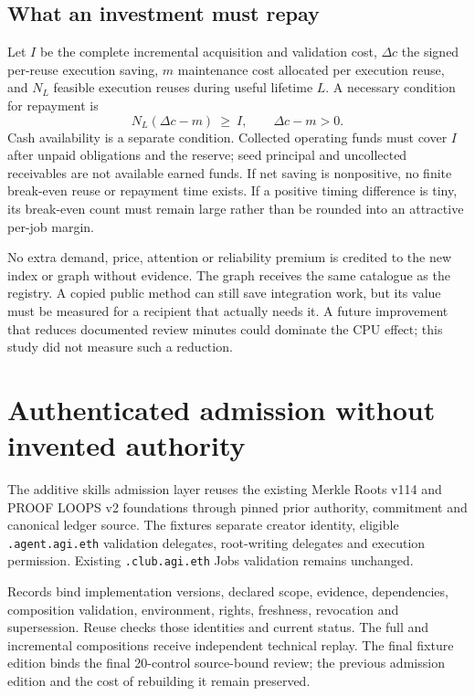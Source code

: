 \documentclass[11pt,letterpaper]{article}
\newcommand{\code}[1]{\texttt{\small #1}}
\begin{document}



\subsection{What an investment must repay}

Let $I$ be the complete incremental acquisition and validation cost, $\Delta c$ the signed
per-reuse execution saving, $m$ maintenance cost allocated per execution reuse, and $N_L$ feasible execution reuses
during useful lifetime $L$. A necessary condition for repayment is
\[
          N_L(\Delta c-m)\ \geq\ I,\qquad \Delta c-m>0.
\]
Cash availability is a separate condition. Collected operating funds must cover $I$ after
unpaid obligations and the reserve; seed principal and uncollected receivables are not available
earned funds. If net saving is nonpositive, no finite break-even reuse or repayment time exists.
If a positive timing difference is tiny, its break-even count must remain large rather than be
rounded into an attractive per-job margin.

No extra demand, price, attention or reliability premium is credited to the new index or graph
without evidence. The graph receives the same catalogue as the registry. A copied public
method can still save integration work, but its value must be measured for a recipient that
actually needs it. A future improvement that reduces documented review minutes could dominate
the CPU effect; this study did not measure such a reduction.

\section{Authenticated admission without invented authority}

The additive skills admission layer reuses the existing Merkle Roots v114 and PROOF LOOPS v2
foundations through pinned prior authority, commitment and canonical ledger source. The fixtures
separate creator identity, eligible \code{*.agent.agi.eth} validation delegates, root-writing
delegates and execution permission. Existing \code{*.club.agi.eth} Jobs validation remains
unchanged.

Records bind implementation versions, declared scope, evidence, dependencies, composition
validation, environment, rights, freshness, revocation and supersession. Reuse checks those
identities and current status. The full and incremental compositions receive independent
technical replay. The final fixture edition binds the final 20-control source-bound review;
the previous admission edition and the cost of rebuilding it remain preserved.
\end{document}
